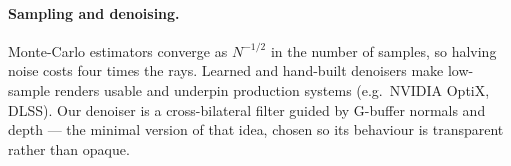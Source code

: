 \paragraph{Sampling and denoising.} Monte-Carlo estimators converge as
$N^{-1/2}$ in the number of samples, so halving noise costs four times the rays.
Learned and hand-built denoisers \cite{chaitanya2017interactive} make low-sample
renders usable and underpin production systems (e.g.\ NVIDIA OptiX, DLSS). Our
denoiser is a cross-bilateral filter \cite{tomasi1998bilateral} guided by
G-buffer normals and depth --- the minimal version of that idea, chosen so its
behaviour is transparent rather than opaque.
